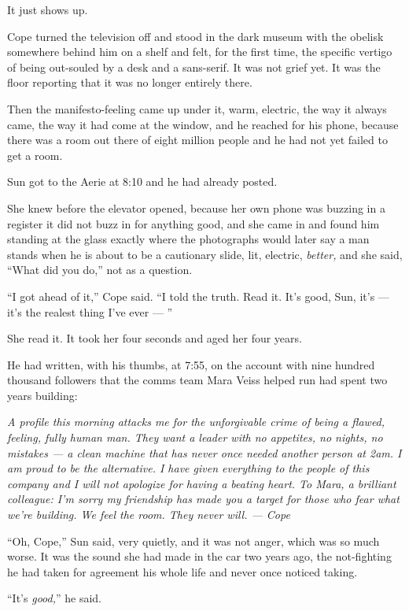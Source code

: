 \documentclass[11pt,openany]{book}
\newcommand{\scenebreak}{\par\vspace{0.5\baselineskip}\begin{center}\textasteriskcentered\quad\textasteriskcentered\quad\textasteriskcentered\end{center}\vspace{0.5\baselineskip}\par}
\begin{document}
It just shows up.

Cope turned the television off and stood in the dark museum with the obelisk somewhere behind him on a shelf and felt, for the first time, the specific vertigo of being out-souled by a desk and a sans-serif. It was not grief yet. It was the floor reporting that it was no longer entirely there.

Then the manifesto-feeling came up under it, warm, electric, the way it always came, the way it had come at the window, and he reached for his phone, because there was a room out there of eight million people and he had not yet failed to get a room.


\scenebreak


Sun got to the Aerie at 8:10 and he had already posted.

She knew before the elevator opened, because her own phone was buzzing in a register it did not buzz in for anything good, and she came in and found him standing at the glass exactly where the photographs would later say a man stands when he is about to be a cautionary slide, lit, electric, \textit{better,} and she said, ``What did you do,'' not as a question.

``I got ahead of it,'' Cope said. ``I told the truth. Read it. It's good, Sun, it's --- it's the realest thing I've ever --- ''

She read it. It took her four seconds and aged her four years.

He had written, with his thumbs, at 7:55, on the account with nine hundred thousand followers that the comms team Mara Veiss helped run had spent two years building:

\textit{A profile this morning attacks me for the unforgivable crime of being a flawed, feeling, fully human man. They want a leader with no appetites, no nights, no mistakes --- a clean machine that has never once needed another person at 2am. I am proud to be the alternative. I have given everything to the people of this company and I will not apologize for having a beating heart. To Mara, a brilliant colleague: I'm sorry my friendship has made you a target for those who fear what we're building. We feel the room. They never will. --- Cope}

``Oh, Cope,'' Sun said, very quietly, and it was not anger, which was so much worse. It was the sound she had made in the car two years ago, the not-fighting he had taken for agreement his whole life and never once noticed taking.

``It's \textit{good,}'' he said.
\end{document}
